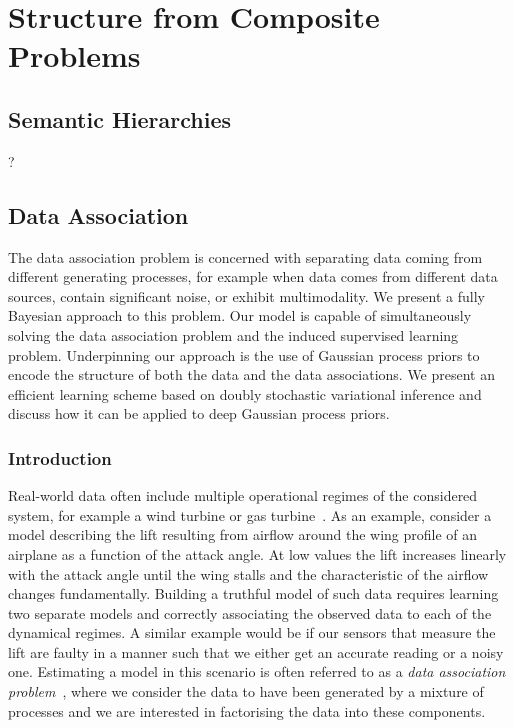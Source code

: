 \chapter{Structure from Composite Problems}
\label{cha:structure_from_composite_problems}


\section{Semantic Hierarchies}
\label{sec:semantic_hierarchies}
?


\section{Data Association}
\label{sec:data_association:data_association}
The data association problem is concerned with separating data coming from different generating processes, for example when data comes from different data sources, contain significant noise, or exhibit multimodality.
We present a fully Bayesian approach to this problem.
Our model is capable of simultaneously solving the data association problem and the induced supervised learning problem.
Underpinning our approach is the use of Gaussian process priors to encode the structure of both the data and the data associations.
We present an efficient learning scheme based on doubly stochastic variational inference and discuss how it can be applied to deep Gaussian process priors.


\subsection{Introduction}
\label{sub:data_association:introduction}
Real-world data often include multiple operational regimes of the considered system, for example a wind turbine or gas turbine~\parencite{hein_benchmark_2017}.
As an example, consider a model describing the lift resulting from airflow around the wing profile of an airplane as a function of the attack angle.
At low values the lift increases linearly with the attack angle until the wing stalls and the characteristic of the airflow changes fundamentally.
Building a truthful model of such data requires learning two separate models and correctly associating the observed data to each of the dynamical regimes.
A similar example would be if our sensors that measure the lift are faulty in a manner such that we either get an accurate reading or a noisy one.
Estimating a model in this scenario is often referred to as a \emph{data association problem}~\parencite{barshalom_tracking_1990,cox_review_1993}, where we consider the data to have been generated by a mixture of processes and we are interested in factorising the data into these components.

